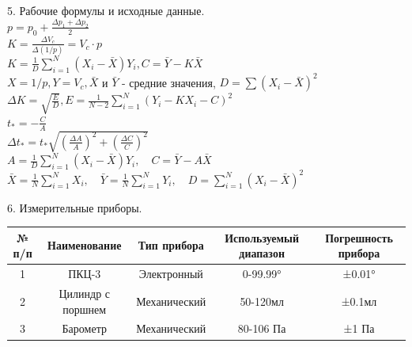 \documentclass[12pt]{article}
\begin{document}
\begin{flushleft}
    5. Рабочие формулы и исходные данные. \\
    $ p = p_0 + \frac{\Delta p_1 + \Delta p_2}{2} $ \\
    $ K = \frac{\Delta V_{c}}{\Delta (1/p)} = V_c \cdot p $ \\
    $ K = \frac{1}{D} \sum^N_{i=1}(X_i - \bar{X})Y_i, C = \bar{Y} - K\bar{X} $ \\
    $ X = 1/p, Y = V_c, \bar{X} $ и $ \bar{Y} $ - средние значения, $ D = \sum(X_i - \bar{X})^2 $ \\
    $ \Delta K = \sqrt{\frac{E}{D}}, E = \frac{1}{N-2}\sum^N_{i=1}(Y_i-KX_i-C)^2 $ \\
    $ t_* = -\frac{C}{A} $ \\
    $ \Delta t_* = t_* \sqrt{(\frac{\Delta A}{A})^2 + (\frac{\Delta C}{C})^2} $ \\
    $ A = \frac{1}{D} \sum_{i=1}^{N} (X_i - \bar{X}) Y_i, \quad C = \bar{Y} - A \bar{X} \label{eq:16} $ \\
    $ \bar{X} = \frac{1}{N} \sum_{i=1}^{N} X_i, \quad \bar{Y} = \frac{1}{N} \sum_{i=1}^{N} Y_i, \quad D = \sum_{i=1}^{N} (X_i - \bar{X})^2 $ \\
\end{flushleft}

\begin{flushleft}
    6. Измерительные приборы. \\
    \begin{table}[h]
        \centering
        \renewcommand{\arraystretch}{1.5}
        {\itshape
        \begin{tabular}{|c|c|c|c|c|}
            \hline
            № п/п & Наименование & Тип прибора & Используемый диапазон & Погрешность прибора\\
            \hline
            1 & ПКЦ-3 & Электронный & 0-99.99° & ±0.01° \\
            \hline
            2 & Цилиндр с поршнем & Механический & 50-120мл & ±0.1мл \\
            \hline
            3 & Барометр & Механический & 80-106 Па & ±1 Па \\
            \hline
        \end{tabular}
        }
    \end{table}
\end{flushleft}
\end{document}

